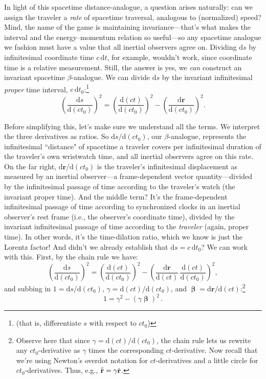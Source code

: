 \documentclass[12pt]{article}
\renewcommand{\mathring}[1]{\accentset{\circ}{#1}}
\renewcommand{\vv}[1]{\mathbf{#1}}
\newcommand{\dd}[1]{\mathrm{d}#1}
\newcommand{\vvbeta}{\bm{\upbeta}}
\begin{document}
In light of this spacetime distance-analogue, a question arises naturally: can we assign the traveler a \emph{rate} of spacetime traversal, analogous to (normalized) speed? Mind, the name of the game is maintaining invariance---that's what makes the interval and the energy--momentum relation so useful---so any spacetime analogue we fashion must have a value that all inertial observers agree on. Dividing $\dd s$ by infinitesimal coordinate time $c \, \dd t$, for example, wouldn't work, since coordinate time is a relative measurement. Still, the answer is yes, we \emph{can} construct an invariant spacetime $\beta$-analogue. We can divide $\dd s$ by the invariant infinitesimal \emph{proper} time interval, $c \, \dd t_0$:\footnote{(that is, differentiate $s$ with respect to $ct_0$)}
\begin{equation*}
\left(\dfrac{\dd s}{\dd (ct_0)} \right)^2 = \left(\dfrac{\dd (ct)}{\dd (c t_0)} \right)^2 - \left(\dfrac{\dd \vv r}{\dd (c t_0)} \right)^2.
\end{equation*}

Before simplifying this, let's make sure we understand all the terms. We interpret the three derivatives as ratios. So $\dd s/\dd (c t_0)$, our $\beta$-analogue, represents the infinitesimal ``distance" of spacetime a traveler covers per infinitesimal duration of the traveler's own wristwatch time, and all inertial observers agree on this rate. On the far right, $\dd \vv r/\dd (c t_0)$ is the traveler's infinitesimal displacement as measured by an inertial observer---a frame-dependent vector quantity---divided by the infinitesimal passage of time according to the traveler's watch (the invariant proper time). And the middle term? It's the frame-dependent infinitesimal passage of time according to synchronized clocks in an inertial observer's rest frame (i.e., the observer's coordinate time), divided by the invariant infinitesimal passage of time according to the \emph{traveler} (again, proper time). In other words, it's the time-dilation ratio, which we know is just the Lorentz factor! And didn't we already establish that $\dd s = c \, \dd t_0$? We can work with this. First, by the chain rule we have:
\begin{equation*}
\left(\dfrac{\dd s}{\dd (c t_0)} \right)^2 = \left(\dfrac{\dd (ct)}{\dd (c t_0)} \right)^2 - \left( \dfrac{\dd \vv r}{\dd (ct)} \, \dfrac{\dd (ct)}{\dd (c t_0)} \right)^2,
\end{equation*}
and subbing in $1 = \dd s / \dd (c t_0)$, $\gamma = \dd (ct) / \dd (c t_0)$, and $\vvbeta = \dd \vv r / \dd (ct)$:\footnote{\label{fn:cr}Observe here that since $\gamma = \dd (ct) / \dd (c t_0)$, the chain rule lets us rewrite any $c t_0$-derivative as $\gamma$ times the corresponding $ct$-derivative. Now recall that we're using Newton's overdot notation for $ct$-derivatives and a little circle for $c t_0$-derivatives. Thus, e.g., $\mathring{\vv r} = \gamma \dot{\vv r}$.}
\begin{equation}\label{eq:25}
\boxed{1 = \gamma^2 - \left(\gamma \vvbeta \right)^2} \, .
\end{equation}
\end{document}

